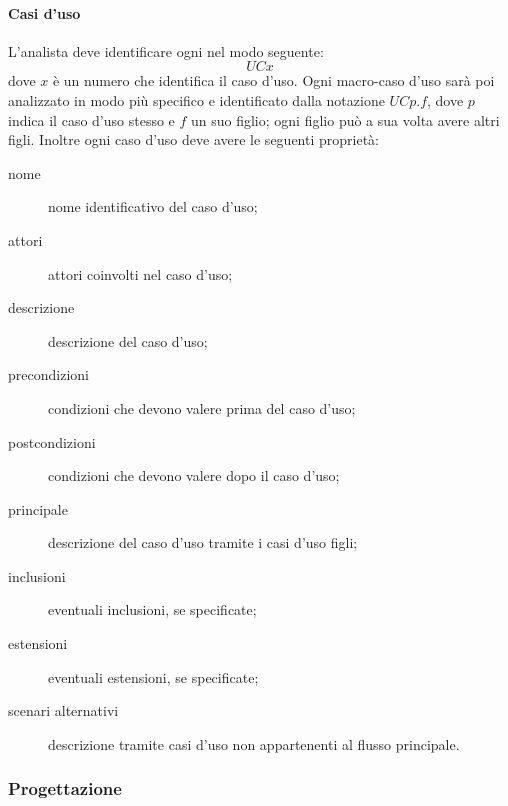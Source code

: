 		\paragraph{Casi d'uso}
		L'analista deve identificare ogni  nel modo seguente:
			\[UCx\]
		dove $x$ è un numero che identifica il caso d'uso. Ogni macro-caso d'uso sarà poi analizzato in modo più specifico e identificato dalla notazione $UCp.f$, dove $p$ indica il caso d'uso stesso e $f$ un suo figlio; ogni figlio può a sua volta avere altri figli. Inoltre ogni caso d'uso deve avere le seguenti proprietà:
		\begin{description}
			\item[nome] nome identificativo del caso d'uso;
			\item[attori] attori coinvolti nel caso d'uso;
			\item[descrizione] descrizione del caso d'uso;
			\item[precondizioni] condizioni che devono valere prima del caso d'uso;
			\item[postcondizioni] condizioni che devono valere dopo il caso d'uso;
			\item[ principale] descrizione del caso d'uso tramite i casi d'uso figli;
			\item[inclusioni] eventuali inclusioni, se specificate;
			\item[estensioni] eventuali estensioni, se specificate;
			\item[scenari alternativi] descrizione tramite casi d'uso non appartenenti al flusso principale.
		\end{description}

	\subsubsection{Progettazione} \label{sec:design}
